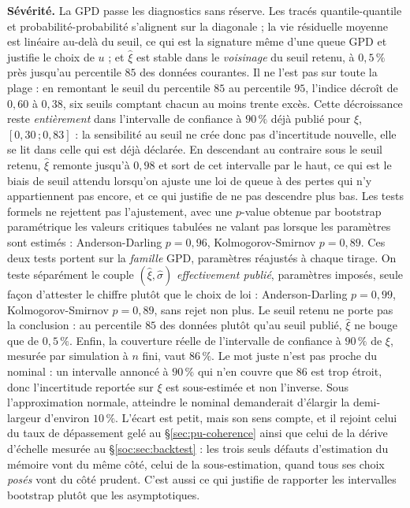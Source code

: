 \textbf{Sévérité.} La GPD passe les diagnostics sans réserve. Les tracés quantile-quantile et
probabilité-probabilité s'alignent sur la diagonale ; la vie résiduelle moyenne est linéaire
au-delà du seuil, ce qui est la signature même d'une queue GPD et justifie le choix de $u$ ;
et $\hat\xi$ est stable dans le \emph{voisinage} du seuil retenu, à $0{,}5\,\%$ près jusqu'au
percentile $85$ des données courantes. Il ne l'est pas sur toute la plage :
en remontant le seuil du percentile $85$ au percentile $95$, l'indice décroît de $0{,}60$ à
$0{,}38$, six seuils comptant chacun au moins trente excès. Cette décroissance reste
\emph{entièrement} dans l'intervalle de confiance à $90\,\%$ déjà publié pour $\xi$,
$[0{,}30\,;0{,}83]$ : la sensibilité au seuil ne crée donc pas d'incertitude nouvelle, elle se
lit dans celle qui est déjà déclarée. En descendant au contraire sous le seuil retenu, $\hat\xi$
remonte jusqu'à $0{,}98$ et sort de cet intervalle par le haut, ce qui est le biais de seuil
attendu lorsqu'on ajuste une loi de queue à des pertes qui n'y appartiennent pas encore, et ce
qui justifie de ne pas descendre plus bas. Les tests formels
ne rejettent pas l'ajustement, avec une $p$-value obtenue par bootstrap paramétrique
les valeurs critiques tabulées ne valant pas lorsque les paramètres sont estimés :
Anderson-Darling $p=0{,}96$, Kolmogorov-Smirnov $p=0{,}89$. Ces deux tests portent sur la
\emph{famille} GPD, paramètres réajustés à chaque tirage. On teste séparément le couple
$(\hat\xi,\hat\sigma)$ \emph{effectivement publié}, paramètres imposés, seule façon d'attester
le chiffre plutôt que le choix de loi : Anderson-Darling $p=0{,}99$, Kolmogorov-Smirnov
$p=0{,}89$, sans rejet non plus. Le seuil retenu ne porte pas la conclusion : au percentile
$85$ des données plutôt qu'au seuil publié, $\hat\xi$ ne bouge que de $0{,}5\,\%$. Enfin,
la couverture réelle
de l'intervalle de confiance à $90\,\%$ de $\xi$, mesurée par simulation à $n$ fini, vaut
$86\,\%$. Le mot juste n'est pas \og{}proche du nominal\fg{} : un intervalle annoncé à
$90\,\%$ qui n'en couvre que $86$ est trop étroit, donc l'incertitude reportée sur
$\xi$ est sous-estimée et non l'inverse. Sous l'approximation normale, atteindre le nominal
demanderait d'élargir la demi-largeur d'environ $10\,\%$. L'écart est petit, mais son sens
compte, et il rejoint celui du taux de dépassement gelé au \S\ref{sec:pu-coherence} ainsi que
celui de la dérive d'échelle mesurée au \S\ref{soc:sec:backtest} : les trois seuls défauts
d'estimation du mémoire vont du même côté, celui de la sous-estimation, quand tous ses choix
\emph{posés} vont du côté prudent. C'est aussi ce qui justifie de rapporter les
intervalles bootstrap plutôt que les asymptotiques.

